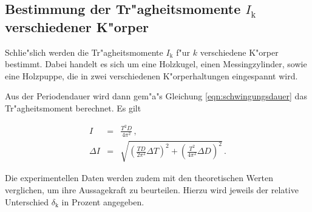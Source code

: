 		\subsection{Bestimmung der Tr"agheitsmomente $I_\mathrm{k}$ verschiedener K"orper}
		\label{subsec:versch_momente}
			Schlie"slich werden die Tr"agheitsmomente $I_\mathrm{k}$ f"ur $k$ verschiedene K"orper bestimmt.
			Dabei handelt es sich um eine Holzkugel, einen Messingzylinder, sowie eine Holzpuppe, die in zwei verschiedenen K"orperhaltungen eingespannt wird.

			Aus der Periodendauer wird dann gem"a"s Gleichung \eqref{eqn:schwingungsdauer} das Tr"agheitsmoment berechnet.
			Es gilt

			\begin{eqnarray*}
				I & = & \frac{T^2 D}{4 \pi^2} \,, \\
				\Delta I & = & \sqrt{\left(\frac{TD}{2 \pi^2} \Delta T\right)^2 + \left(\frac{T^2}{4 \pi^2} \Delta D\right)^2} \,.
			\end{eqnarray*}

			Die experimentellen Daten werden zudem mit den theoretischen Werten verglichen, um ihre Aussagekraft zu beurteilen.
			Hierzu wird jeweils der relative Unterschied $\delta_\mathrm{k}$ in Prozent angegeben.

			\clearpage

